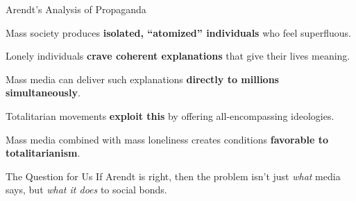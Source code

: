 \documentclass[aspectratio=169]{beamer}
\begin{document}
\begin{frame}{Arendt's Analysis of Propaganda}
\begin{argument}
  \item Mass society produces \textbf{isolated, ``atomized'' individuals} who feel superfluous.
  \item Lonely individuals \textbf{crave coherent explanations} that give their lives meaning.
  \item Mass media can deliver such explanations \textbf{directly to millions simultaneously}.
  \item Totalitarian movements \textbf{exploit this} by offering all-encompassing ideologies.
  \item[\textbf{$\therefore$}] Mass media combined with mass loneliness creates conditions \textbf{favorable to totalitarianism}.
\end{argument}

\vspace{0.5em}

\vspace{0.3em}
\begin{alertblock}{The Question for Us}
If Arendt is right, then the problem isn't just \textit{what} media says, but \textit{what it does} to social bonds.
\end{alertblock}
\end{frame}
\end{document}

